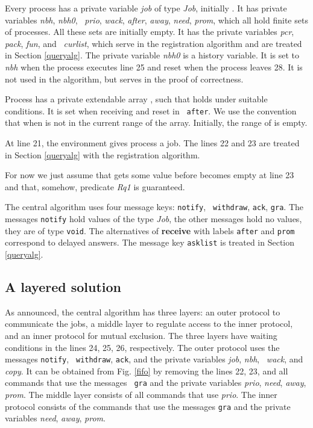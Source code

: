 \documentclass[10pt]{article} \usepackage[english]{babel}
\def\S #1/{\mbox {\textsl{#1}}}
\def\B #1/{\mbox {\textbf{#1}}}
\def\T #1/{\mbox {\texttt{#1}}}
\begin{document}
Every process has a private variable \S job/ of type \S Job/,
initially . It has private variables \S nbh/, \S nbh0/, \S
prio/, \S wack/, \S after/, \S away/, \S need/, \S prom/, which all
hold finite sets of processes.  All these sets are initially empty.
It has the private variables \S pcr/, \S pack/, \S fun/, and \S
curlist/, which serve in the registration algorithm and are treated in
Section \ref{queryalg}.  The private variable \S nbh0/ is a history
variable.  It is set to \S nbh/ when the process executes line 25 and
reset when the process leaves 28. It is not used in the algorithm, but
serves in the proof of correctness.

Process  has a private extendable array , such that  holds under suitable
conditions.  It is set when receiving  and reset in \T
after/.  We use the convention that  when
 is not in the current range of the array. Initially, the range of
 is empty.

At line 21, the environment gives process  a job.  The lines 22 and
23 are treated in Section \ref{queryalg} with the registration
algorithm.

For now we just assume that  gets some value before  becomes empty at line 23 and that, somehow, predicate
\S Rq1/ is guaranteed.  

The central algorithm uses four message keys: \T notify/, \T
withdraw/, \T ack/, \T gra/. The messages \T notify/ hold values of
the type \S Job/, the other messages hold no values, they are of type
\T void/.  The alternatives of \B receive/ with labels \T after/ and
\T prom/ correspond to delayed answers.  The message key \T asklist/
is treated in Section \ref{queryalg}.

\subsection{A layered solution} \label{layered}

As announced, the central algorithm has three layers: an outer
protocol to communicate the jobs, a middle layer to regulate access to
the inner protocol, and an inner protocol for mutual exclusion.  The
three layers have waiting conditions in the lines 24, 25, 26,
respectively.  The outer protocol uses the messages \T notify/, \T
withdraw/, \T ack/, and the private variables \S job/, \S nbh/, \S
wack/, and \S copy/. It can be obtained from Fig. \ref{fifo} by
removing the lines 22, 23, and all commands that use the messages \T
gra/ and the private variables \S prio/, \S need/, \S away/, \S prom/.
The middle layer consists of all commands that use \S prio/.  The
inner protocol consists of the commands that use the messages \T gra/
and the private variables \S need/, \S away/, \S prom/.
\end{document}
